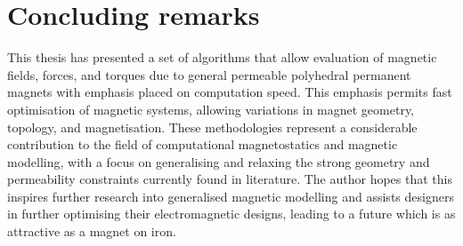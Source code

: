\section{Concluding remarks}
This thesis has presented a set of algorithms that allow evaluation of magnetic fields, forces, and torques due to general permeable polyhedral permanent magnets with emphasis placed on computation speed. This emphasis permits fast optimisation of magnetic systems, allowing variations in magnet geometry, topology, and magnetisation. These methodologies represent a considerable contribution to the field of computational magnetostatics and magnetic modelling, with a focus on generalising and relaxing the strong geometry and permeability constraints currently found in literature. The author hopes that this inspires further research into generalised magnetic modelling and assists designers in further optimising their electromagnetic designs, leading to a future which is as attractive as a magnet on iron.